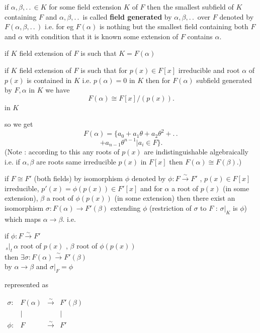 \documentclass[11pt]{extarticle}
\newcommand{\ra}{\rightarrow}
\newcommand{\ck}{.\,.\,}
\newcommand{\snote}[1]{{\footnotesize(#1)}}
\newcommand{\st}{\,{}_{s}|_t\,}
\newcommand{\tbx}[2][]{
\begin{tcolorbox}[enhanced,breakable,size=small,colback=black!2!white,title={#1},arc is angular, arc=1.5mm,drop fuzzy shadow]
	#2
\end{tcolorbox}
}
\newcommand{\rai}{\xrightarrow{\sim}}
\begin{document}
\begin{multicols}{2}
\tbx[$ F(\alpha,\beta,\ck) $]{ if $ \alpha,\beta,\ck \in K $ for some field extension $ K $ of $ F $ then the smallest subfield of $ K $ containing $ F $ and $  \alpha,\beta,\ck $ is called \textbf{field generated} by $ \alpha,\beta,\ck  $ over $ F $ denoted by $ F(\alpha,\beta,\ck ) $ i.e. for eg $ F(\alpha) $ is nothing but the smallest field containing both $ F $ and $ \alpha $ with condition that it is known some extension of $ F $ contains $ \alpha $.
		} 
\tbx[Simple extension]{if $ K $ field extension of $ F $ is such that $ K=F(\alpha) $ 
		} 
\tbx{if $ K $ field extension of $ F $ is such that for $ p(x)\in F[x] $ irreducible and root $ \alpha $ of $ p(x) $ is contained in $ K $ i.e. $ p(\alpha)=0 $ in $ K $ then for $ F(\alpha) $ subfield generated by $ F,\alpha $ in $ K $ we have  
	\[F(\alpha)\cong F[x]/(p(x)) .\] in $ K $ }
\tbx{	so we get 
		\[  F(\alpha)=\{a_0+a_1\theta+a_2\theta^2+\ck \]\[+a_{n-1} \theta^{n-1}| a_i \in F \}.\]
		\snote{Note : according to this any roots of $ p(x) $ are indistinguishable algebraically i.e. if $ \alpha,\beta $ are roots same irreducible $ p(x) $ in $ F[x] $ then $ F(\alpha)\cong F(\beta) $.}
		} 
\tbx{if $ F\cong F' $ (both fields) by isomorphism $ \phi  $ denoted by $ \phi : F \rai F'$ , 
	$ p(x)\in F[x] $ irreducible, $ p'(x)=\phi(p(x))\in F'[x] $ 
		and for $ \alpha $ a root of $p(x) $ (in some extension), $ \beta $ a root of $ \phi(p(x))$ (in some extension) then there exist an isomorphism $ \sigma : F(\alpha)\ra F'(\beta) $ extending $ \phi $ (restriction of $ \sigma $ to $ F $ $ : \, \sigma|_K $ is $ \phi $) which maps $ \alpha  \ra \beta$. i.e.
		\begin{center}
			if $ \phi : F \rai F' $\\
			$\st \alpha$ root of $p(x)$ , $ \beta$ root of $\phi(p(x))$\\
			then $\exists \sigma : F(\alpha)\rai F'(\beta)$\\
			by $ \alpha \ra \beta $ and $ \sigma|_F=\phi $  
		\end{center} 
 represented as 
\begin{center} 
		$\begin{matrix}
 	\sigma : & F(\alpha)&\rai&F'(\beta)\\
 	&|&&|\\
 	\phi : & F & \rai & F'
 	\end{matrix}$ 
 \end{center}
}

\end{multicols}
\end{document}
